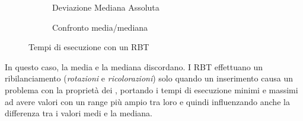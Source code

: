 \documentclass[a4paper,titlepage]{article}
\begin{document}
\begin{figure}[h]
  \centering
  \begin{subfigure}{\textwidth}
    \captionsetup{justification=centering}
    \caption{Deviazione Mediana Assoluta}
     \label{fig:rbt_mad}
  \end{subfigure}%
   \vspace{2pt}
  \begin{subfigure}{\textwidth}
    \captionsetup{justification=centering}
     \caption{Confronto media/mediana}
     \label{fig:rbt_mean_median}
  \end{subfigure}
  \caption{Tempi di esecuzione con un RBT}
\end{figure}

In questo caso, la media e la mediana discordano.
I RBT effettuano un ribilanciamento (\textit{rotazioni} e \textit{ricolorazioni}) solo quando un inserimento causa un problema con la proprietà dei , portando i tempi di esecuzione minimi e massimi ad avere valori con un range più ampio tra loro e quindi influenzando anche la differenza tra i valori medi e la mediana.
\newpage
\end{document}
